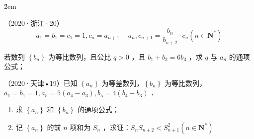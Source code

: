 \v{2em}

\begin{example}
    （2020·浙江·20）
    $$
        a_1=b_1=c_1=1, c_n=a_{n+1}-a_n, c_{n+1}=\frac{b_n}{b_{n+2}} \cdot c_n\left(n \in \mathbf{N}^*\right)
    $$

    若数列 $\left\{b_n\right\}$ 为等比数列，且公比 $q>0$ ，且 $b_1+b_2=6 b_3$ ，求 $q$ 与 $a_n$ 的通项公式；
\end{example}

\vspace{10em}

\begin{example}
    （2020·天津•19）已知 $\left\{a_n\right\}$ 为等差数列，$\left\{b_n\right\}$ 为等比数列，$a_1=b_1=1, a_5=5\left(a_4-a_3\right), b_5=4\left(b_4-b_3\right)$ ．
    \begin{enumerate}
        \item 求 $\left\{a_n\right\}$ 和 $\left\{b_n\right\}$ 的通项公式；
        \item 记 $\left\{a_n\right\}$ 的前 $n$ 项和为 $S_n$ ，求证：$S_n S_{n+2}<S_{n+1}^2\left(n \in \mathbf{N}^*\right)$
    \end{enumerate}
\end{example}

\vspace{10em}
